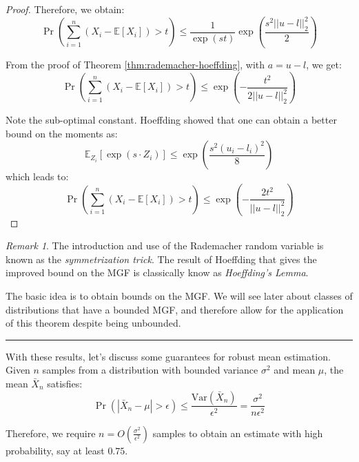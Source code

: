 \documentclass{article}
\theoremstyle{remark}
\newtheorem*{remark}{Remark}
\newcommand{\comprule}{\textcolor[RGB]{220,220,220}{\rule{\linewidth}{0.2pt}}}
\newcommand{\Exp}{\mathbb{E}}
\newcommand{\Var}{\mathrm{Var}}
\begin{document}
\begin{proof}
Therefore, we obtain:
\begin{equation*}
\Pr\left(\sum_{i=1}^{n}(X_{i} - \Exp[X_{i}]) > t\right) \leq \frac{1}{\exp(st)}\exp\left(\frac{s^{2}||u - l||_{2}^{2}}{2}\right)
\end{equation*}

From the proof of Theorem \ref{thm:rademacher-hoeffding}, with \(a = u - l\), we get:
\begin{equation*}
\Pr\left(\sum_{i=1}^{n}(X_{i} - \Exp[X_{i}]) > t\right) \leq \exp\left(-\frac{t^{2}}{2||u - l||_{2}^{2}}\right)
\end{equation*}

Note the sub-optimal constant. Hoeffding showed that one can obtain a better bound on the moments as:
\begin{equation*}
\Exp_{Z_{i}}\left[\exp(s \cdot Z_{i})\right] \leq \exp\left(\frac{s^{2}(u_{i} - l_{i})^{2}}{8}\right)
\end{equation*}
which leads to:
\begin{equation*}
\Pr\left(\sum_{i=1}^{n}(X_{i} - \Exp[X_{i}]) > t\right) \leq \exp\left(-\frac{2t^{2}}{||u - l||_{2}^{2}}\right)
\end{equation*}

\end{proof}

\begin{remark}
The introduction and use of the Rademacher random variable is known as the \emph{symmetrization trick}. The result of Hoeffding that gives the improved bound on the MGF is classically know as \emph{Hoeffding's Lemma}.

The basic idea is to obtain bounds on the MGF. We will see later about classes of distributions that have a bounded MGF, and therefore allow for the application of this theorem despite being unbounded.
\end{remark}

\comprule

With these results, let's discuss some guarantees for robust mean estimation. Given \(n\) samples from a distribution with bounded variance \(\sigma^{2}\) and mean \(\mu\), the mean \(\bar{X}_{n}\) satisfies:
\begin{equation*}
\Pr\left(|\bar{X}_{n} - \mu| > \epsilon\right) \leq \frac{\Var(\bar{X}_{n})}{\epsilon^{2}} = \frac{\sigma^{2}}{n\epsilon^{2}}
\end{equation*}

Therefore, we require \(n = O\left(\frac{\sigma^{2}}{\epsilon^{2}}\right)\) samples to obtain an estimate with high probability, say at least \(0.75\).
\end{document}
